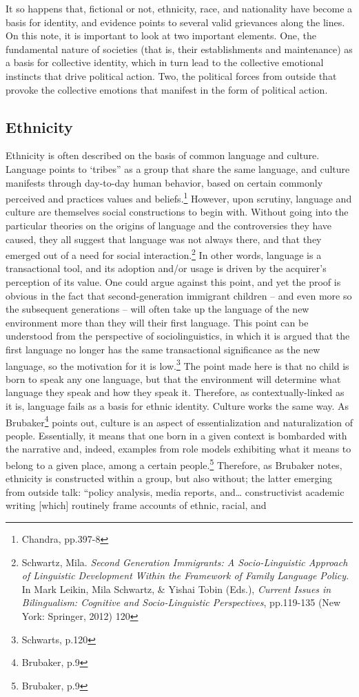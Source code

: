 \documentclass[11pt]{article}
\begin{document}
It so happens that, fictional or not, ethnicity, race, and nationality have become a basis for identity, and evidence points to several valid grievances along the lines. On this note, it is important to look at two important elements. One, the fundamental nature of societies (that is, their establishments and maintenance) as a basis for collective identity, which in turn lead to the collective emotional instincts that drive political action. Two, the political forces from outside that provoke the collective emotions that manifest in the form of political action.

\subsection{Ethnicity}

Ethnicity is often described on the basis of common language and culture. Language points to ‘tribes” as a group that share the same language, and culture manifests through day-to-day human behavior, based on certain commonly perceived and practices values and beliefs.\footnote{Chandra, pp.397-8} However, upon scrutiny, language and culture are themselves social constructions to begin with. Without going into the particular theories on the origins of language and the controversies they have caused, they all suggest that language was not always there, and that they emerged out of a need for social interaction.\footnote{Schwartz, Mila. \textit{Second Generation Immigrants: A Socio-Linguistic Approach of Linguistic Development Within the Framework of Family Language Policy}. In Mark Leikin, Mila Schwartz, \& Yishai Tobin (Eds.), \textit{Current Issues in Bilingualism: Cognitive and Socio-Linguistic Perspectives}, pp.119-135 (New York: Springer, 2012) 120} In other words, language is a transactional tool, and its adoption and/or usage is driven by the acquirer’s perception of its value. One could argue against this point, and yet the proof is obvious in the fact that second-generation immigrant children – and even more so the subsequent generations – will often take up the language of the new environment more than they will their first language. This point can be understood from the perspective of sociolinguistics, in which it is argued that the first language no longer has the same transactional significance as the new language, so the motivation for it is low.\footnote{Schwarts, p.120} The point made here is that no child is born to speak any one language, but that the environment will determine what language they speak and how they speak it. Therefore, as contextually-linked as it is, language fails as a basis for ethnic identity. Culture works the same way. As Brubaker\footnote{Brubaker, p.9} points out, culture is an aspect of essentialization and naturalization of people. Essentially, it means that one born in a given context is bombarded with the narrative and, indeed, examples from role models exhibiting what it means to belong to a given place, among a certain people.\footnote{Brubaker, p.9} Therefore, as Brubaker notes, ethnicity is constructed within a group, but also without; the latter emerging from outside talk: “policy analysis, media reports, and… constructivist academic writing [which] routinely frame accounts of ethnic, racial, and 
\end{document}
